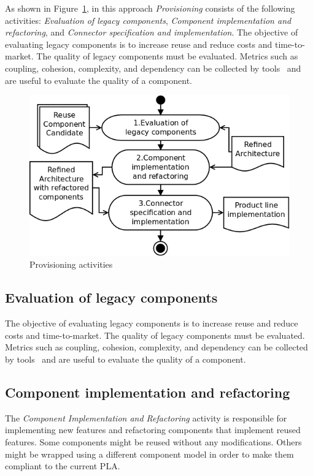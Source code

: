 \documentclass[11pt,twoside]{article}
\begin{document}
As shown in Figure~\ref{fig:provisioning}, in this approach \textit{Provisioning} consists of the following activities: \textit{Evaluation of legacy
components}, \textit{Component
implementation and refactoring}, and \textit{Connector specification and implementation}. The objective of evaluating legacy components is to increase
reuse and reduce costs and time-to-market. The
quality of legacy components must be evaluated. Metrics such as coupling, cohesion, complexity, and dependency can be collected by
tools~\cite{Lee:2009:ERU} and are useful to
evaluate the quality of a component.

\begin{figure}[!htb]
   \centering
   \includegraphics[scale=0.3]{figs/provisioning.png}
   \caption{Provisioning activities}
   \label{fig:provisioning}
\end{figure}

\subsection{Evaluation of legacy components}
The objective of evaluating legacy components is to increase reuse and reduce costs and time-to-market. The quality of legacy components must be
evaluated. Metrics such as coupling, cohesion, complexity, and dependency can be collected by tools~\cite{Lee:2009:ERU} and are useful to
evaluate the quality of a component.

\subsection{Component implementation and refactoring}
The \textit{Component Implementation and Refactoring} activity is responsible for implementing new features and refactoring components that
implement reused features. Some components might be reused without any
modifications. Others might be wrapped using a different component model in order to make them compliant to the current PLA.
\end{document}
